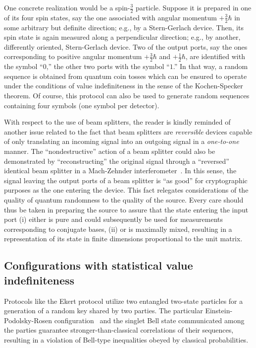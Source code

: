 \documentclass[12pt]{elsarticle}%
\begin{document}
One concrete realization would be a spin-$\frac{3}{2}$ particle. Suppose it is prepared
in one of its four spin states, say the one associated with angular momentum $+\frac{3}{2}\hbar$ in
some arbitrary but definite direction; e.g., by a Stern-Gerlach device.
Then, its  spin state is  again measured along a perpendicular direction;
e.g., by another, differently oriented, Stern-Gerlach device.
Two of the output ports, say the ones corresponding to positive angular momentum $+\frac{3}{2}\hbar$
and $+\frac{1}{2}\hbar$,
are identified with the symbol ``$0$,'' the other two ports with the symbol ``$1$.''
In that way, a random sequence is obtained from quantum coin tosses
which can be ensured to operate under the conditions of value indefiniteness
in the sense of the Kochen-Specker theorem.
Of course, this protocol can also be used to generate random sequences
containing four symbols (one symbol per detector).

With respect to the use of beam splitters, the reader is kindly reminded of another
issue related to the fact that beam splitters are {\em reversible} devices capable of only
translating an incoming  signal into an outgoing  signal in a {\em one-to-one} manner.
The ``nondestructive'' action of a beam splitter could also be demonstrated
by ``reconstructing'' the original signal through a ``reversed'' identical beam splitter
in a Mach-Zehnder interferometer~\cite{green-horn-zei}.
In this sense, the signal leaving the output ports of a beam splitter
is ``as good'' for cryptographic purposes as the one entering the device.
This fact relegates considerations of the quality of quantum randomness
to the quality of the source. Every care should thus be taken in preparing the source
to  assure that the state entering the input port
(i)  either is pure and could subsequently be used for measurements corresponding to conjugate bases,
(ii) or is maximally mixed, resulting in a representation of its
state in finite dimensions proportional to the unit matrix.

\subsection{Configurations with statistical value indefiniteness}

Protocols like the Ekert protocol \cite{ekert91}
utilize two entangled two-state particles for a generation of
a random key shared by two parties. The particular Einstein-Podolsky-Rosen
configuration~\cite{epr} and the singlet Bell state communicated among the
parties guarantee  stronger-than-classical correlations of their sequences,
resulting in a violation of Bell-type inequalities obeyed by classical probabilities.
\end{document}
